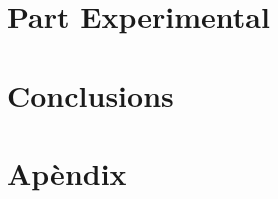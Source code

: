\documentclass[a4paper,12pt,arial,numbered,print,index,oneside]{book}
\begin{document}
	\part{Part Experimental}
	\label{part:experimental_work}
	
	
	\part{Conclusions}
	\label{part:conclusions}
	
	
	\printglossaries
	
	\part{Apèndix}
	\begin{appendices}
		
	\end{appendices}

	
	
	
\end{document}
